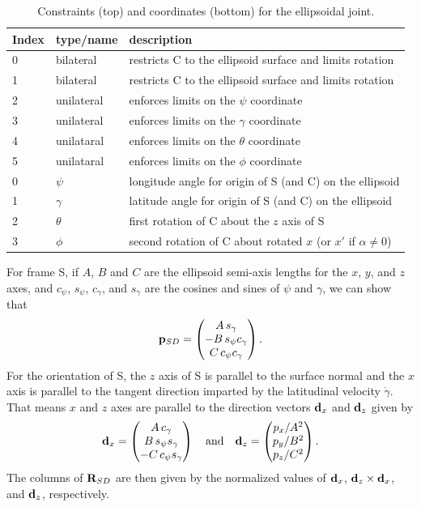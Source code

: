 \begin{table}[h]
\centering
\begin{tabular}{|l|l|l|}
\hline
Index & type/name & description \\
\hline
0 & bilateral & restricts C to the ellipsoid surface and limits rotation \\
1 & bilateral & restricts C to the ellipsoid surface and limits rotation \\
2 & unilateral & enforces limits on the $\psi$ coordinate \\
3 & unilateral & enforces limits on the $\gamma$ coordinate \\
4 & unilataral & enforces limits on the $\theta$ coordinate \\
5 & unilataral & enforces limits on the $\phi$ coordinate \\
\hline
\hline
0 & $\psi$ & longitude angle for origin of S (and C) on the ellipsoid \\
1 & $\gamma$ & latitude angle for origin of S (and C) on the ellipsoid \\
2 & $\theta$ & first rotation of C about the $z$ axis of S \\
3 & $\phi$ & second rotation of C about rotated $x$ (or $x'$ if $\alpha \ne 0$) \\
\hline
\end{tabular}
\caption{Constraints (top) and coordinates (bottom) for the
ellipsoidal joint.}
\label{EllipsoidalConstraints:tbl}
\end{table}

For frame S, if $A$, $B$ and $C$ are the ellipsoid semi-axis lengths
for the $x$, $y$, and $z$ axes, and $c_\psi$, $s_\psi$, $c_\gamma$,
and $s_\gamma$ are the cosines and sines of $\psi$ and $\gamma$, we
can show that
%
\begin{equation*}
{\bf p}_{SD} = \left(\begin{matrix} A \, s_\gamma \\ -B \, s_\psi c_\gamma \\ C \, c_\psi c_\gamma \end{matrix}\right).
\end{equation*}
%
For the orientation of S, the $z$ axis of S is parallel to the surface
normal and the $x$ axis is parallel to the tangent direction imparted
by the latitudinal velocity $\dot\gamma$.  That means $x$ and $z$
axes are parallel to the direction vectors ${\bf d}_x$ and ${\bf d}_z$
given by
%
\begin{equation}
{\bf d}_x = \left(\begin{matrix} A \, c_\gamma \\ B \, s_\psi s_\gamma \\ -C \, c_\psi s_\gamma \end{matrix}\right)
\quad \text{and} \quad
{\bf d}_z = \left(\begin{matrix} p_x/A^2 \\ p_y/B^2 \\ p_z/C^2 \end{matrix}\right).
\label{xzdirections:eqn}
\end{equation}
%
The columns of ${\bf R}_{SD}$ are then given by the normalized values
of ${\bf d}_x$, ${\bf d}_z \times {\bf d}_x$, and ${\bf d}_z$, respectively.

